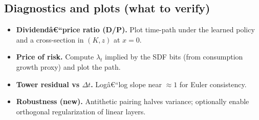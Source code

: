 \documentclass[11pt,letterpaper,oneside]{article}
\numberwithin{equation}{section}
\newcommand{\1}{\mathbf{1}}
\begin{document}
\subsection*{Diagnostics and plots (what to verify)}
\begin{tcolorbox}[didacticstyle]
\begin{itemize}[leftmargin=1.1em,itemsep=0.25em]
  \item \textbf{Dividendâ€“price ratio (D/P).} Plot time-path under the learned policy and a cross-section in $(K,z)$ at $x=0$.
  \item \textbf{Price of risk.} Compute $\lambda_t$ implied by the SDF bits (from consumption growth proxy) and plot the path.
  \item \textbf{Tower residual vs $\Delta t$.} Logâ€“log slope near $\approx 1$ for Euler consistency.
  \item \textbf{Robustness (new).} Antithetic pairing halves variance; optionally enable orthogonal regularization of linear layers.
\end{itemize}
\end{tcolorbox}
\end{document}
